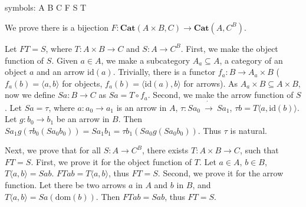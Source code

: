\documentclass{article}
\begin{document}
\subsubsection{}

\subsubsection{}

\subsubsection{}

\subsection{}

\subsubsection{}

\showArt

symbols: A B C F S T

We prove there is a bijection $F : \mathbf{Cat}(A \times B, C) \rightarrow \mathbf{Cat}(A, C^B)$.

Let $FT = S$, where $T : A \times B \rightarrow C$ and $S : A \rightarrow C^B$. First, we make the object function of $S$. Given $a \in A$, we make a subcategory $A_a \subseteq A$, a category of an object $a$ and an arrow $\mathrm{id}(a)$. Trivially, there is a functor $f_a : B \rightarrow A_a \times B$ ($f_a(b) = \langle a, b \rangle$ for objects, $f_a(b) = \langle \mathrm{id}(a), b \rangle$ for arrows). As $A_a \times B \subseteq A \times B$, now we define $Sa : B \rightarrow C$ as $Sa = T \circ f_a$. Second, we make the arrow function of $S$. Let $Sa = \tau$, where $a : a_0 \rightarrow a_1$ is an arrow in $A$, $\tau : S a_0\ \dot{\rightarrow}\ S a_1$, $\tau b = T\langle a, \mathrm{id}(b) \rangle$. Let $g : b_0 \rightarrow b_1$ be an arrow in $B$. Then $Sa_1g(\tau b_0(Sa_0b_0)) = Sa_1b_1 = \tau b_1(Sa_0g (Sa_0b_0))$. Thus $\tau$ is natural.

Next, we prove that for all $S : A \rightarrow C^B$, there exists $T : A \times B \rightarrow C$, such that $FT = S$. First, we prove it for the object function of $T$. Let $a \in A$, $b \in B$, $T\langle a, b \rangle = Sab$. $FTab = T\langle a, b \rangle$, thus $FT = S$. Second, we prove it for the arrow function. Let there be two arrows $a$ in $A$ and $b$ in $B$, and $T\langle a, b \rangle = Sa(\mathrm{dom}(b))$. Then $FTab = Sab$, thus $FT = S$.
\end{document}
